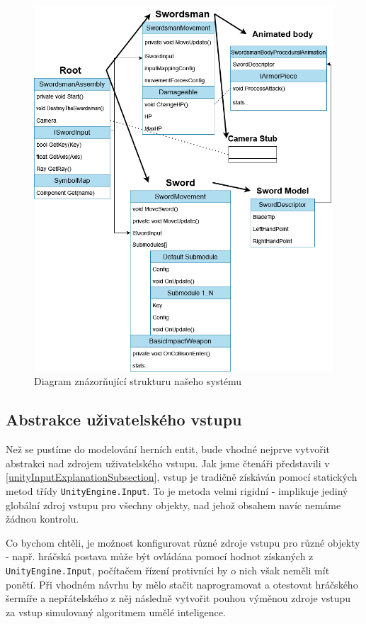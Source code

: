 \begin{figure}[p]\centering
    \center
    \includegraphics[width=145mm]{../img/Structure-diagram.png}
    \caption{Diagram znázorňující strukturu našeho systému}
    \label{obr04:objectModelDiagram}
\end{figure} 

\subsection{Abstrakce uživatelského vstupu}

Než se pustíme do modelování herních entit, bude vhodné nejprve vytvořit abstrakci nad zdrojem uživatelského vstupu. Jak jsme čtenáři představili v \ref{unityInputExplanationSubsection}, vstup je tradičně získáván pomocí statických metod třídy \texttt{UnityEngine.Input}. To je metoda velmi rigidní - implikuje jediný globální zdroj vstupu pro všechny objekty, nad jehož obsahem navíc nemáme žádnou kontrolu. 

Co bychom chtěli, je možnost konfigurovat různé zdroje vstupu pro různé objekty - např. hráčská postava může být ovládána pomocí hodnot získaných z \texttt{UnityEngine.Input}, počítačem řízení protivníci by o nich však neměli mít ponětí. Při vhodném návrhu by mělo stačit naprogramovat a otestovat hráčského šermíře a nepřátelského z něj následně vytvořit pouhou výměnou zdroje vstupu za vstup simulovaný algoritmem umělé inteligence.

